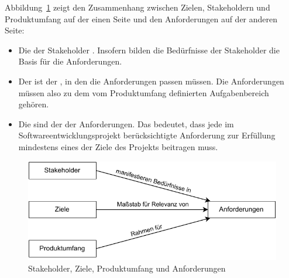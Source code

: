 Abbildung~\ref{fig:stakeholder_ziele_produktumfang_anfoderungen} zeigt den Zusammenhang zwischen Zielen, Stakeholdern und Produkt\-umfang auf der einen Seite und den Anforderungen auf der anderen Seite:

\begin{itemize}
	\item Die \textbf{} der Stakeholder \textbf{}. Insofern bilden die Bedürfnisse der Stakeholder die Basis für die Anforderungen.
	\item Der \textbf{} ist der \textbf{}, in den die Anforderungen passen müssen. Die Anforderungen müssen also zu dem vom Produktumfang definierten Aufgabenbereich gehören.
	
	\pagebreak %
	
	\item Die \textbf{} sind der \textbf{} der Anforderungen. Das bedeutet, dass jede im Softwareentwicklungsprojekt berücksichtigte Anforderung zur Erfüllung mindestens eines der Ziele des Projekts beitragen muss.
\end{itemize}

\begin{figure}[!t]
	\vspace{\baselineskip} %
	\centering
	\includegraphics{Bilder/Kapitel-6/begriffe-version1.pdf}
	\caption{Stakeholder, Ziele, Produktumfang und Anforderungen}
	\label{fig:stakeholder_ziele_produktumfang_anfoderungen}
\end{figure}

